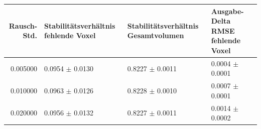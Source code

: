 \begin{tabular}{rlll}
\toprule
Rausch-Std. & Stabilitätsverhältnis fehlende Voxel & Stabilitätsverhältnis Gesamtvolumen & Ausgabe-Delta RMSE fehlende Voxel \\
\midrule
0.005000 & 0.0954 $\pm$ 0.0130 & 0.8227 $\pm$ 0.0011 & 0.0004 $\pm$ 0.0001 \\
0.010000 & 0.0963 $\pm$ 0.0126 & 0.8228 $\pm$ 0.0010 & 0.0007 $\pm$ 0.0001 \\
0.020000 & 0.0956 $\pm$ 0.0132 & 0.8227 $\pm$ 0.0011 & 0.0014 $\pm$ 0.0002 \\
\bottomrule
\end{tabular}
